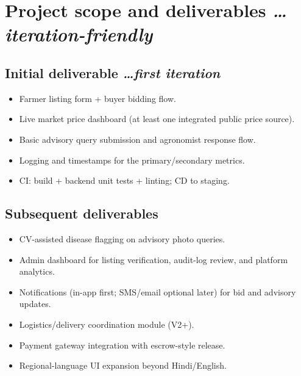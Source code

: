 \documentclass[11pt,a4paper]{article}
\newcommand{\BvrHint}[1]{%
  {\normalfont\normalsize\itshape\hfill #1}}
\begin{document}
\section{Project scope and deliverables %
  \BvrHint{\ldots iteration-friendly}}
\subsection{Initial deliverable %
  \BvrHint{\ldots first iteration}}
\begin{itemize}[leftmargin=0.7cm]
    \item Farmer listing form + buyer bidding flow.
    \item Live market price dashboard (at least one integrated public price source).
    \item Basic advisory query submission and agronomist response flow.
    \item Logging and timestamps for the primary/secondary metrics.
    \item CI: build + backend unit tests + linting; CD to staging.
\end{itemize}

\subsection{Subsequent deliverables}
\begin{itemize}[leftmargin=0.7cm]
    \item CV-assisted disease flagging on advisory photo queries.
    \item Admin dashboard for listing verification, audit-log review, and platform analytics.
    \item Notifications (in-app first; SMS/email optional later) for bid and advisory updates.
    \item Logistics/delivery coordination module (V2+).
    \item Payment gateway integration with escrow-style release.
    \item Regional-language UI expansion beyond Hindi/English.
\end{itemize}
\end{document}
